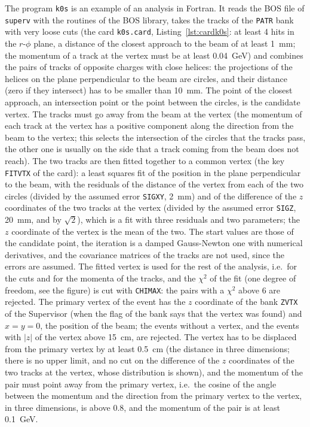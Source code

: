 The program \texttt{k0s} is an example of an analysis in Fortran. It reads the BOS file of \texttt{superv} with the routines of the BOS library, takes the tracks of the \texttt{PATR} bank with very loose cuts (the card \texttt{k0s.card}, Listing~\ref{lst:cardk0s}: at least 4 hits in the $r$-$\phi$ plane,
a distance of the closest approach to the beam of at least 1~mm; the momentum of a track at the vertex must be at least 0.04~GeV) and combines the pairs of tracks of opposite charges with close helices: the projections of the helices on the plane perpendicular to the beam are circles, and their distance
(zero if they intersect) has to be smaller than 10~mm. The point of the closest approach, an intersection point or the point between the circles, is the candidate vertex. The tracks must go away from the beam at the vertex (the momentum of each track at the vertex has a positive component along the direction from the beam to the vertex; this selects the intersection of the circles that the tracks pass, the other one is usually on the side that a track coming from the beam does not reach). The two tracks are then fitted together to a common vertex (the key \texttt{FITVTX} of the card): a least squares fit of the position in the plane perpendicular to the beam, with the residuals of the distance of the vertex from each of the two circles (divided by the assumed error \texttt{SIGXY}, 2~mm) and of the difference of the $z$ coordinates of the two tracks at the vertex (divided by the assumed error \texttt{SIGZ}, 20~mm, and by $\sqrt2$), which is a fit with three residuals and two parameters; the $z$ coordinate of the vertex is the mean of the two. The start values are those of the candidate point, the iteration is a damped Gauss-Newton one with numerical derivatives, and the covariance matrices of the tracks are not used, since the errors are assumed. The fitted vertex is used for the rest of the analysis, i.e.\ for the cuts and for the momenta of the tracks, and the $\chi^2$ of the fit (one degree of freedom, see the figure) is cut with \texttt{CHIMAX}: the pairs with a $\chi^2$ above 6 are rejected. The primary vertex of the event has the $z$ coordinate of the bank \texttt{ZVTX} of the Supervisor (when the flag of the bank says that the vertex was found) and $x=y=0$, the position of the beam; the events without a vertex, and the events with $|z|$ of the vertex above 15~cm, are rejected. The vertex has to be displaced from the primary vertex by at least 0.5~cm (the distance in three dimensions; there is no upper limit, and no cut on the difference of the $z$ coordinates of the two tracks at the vertex, whose distribution is shown), and the momentum of the pair must point away from the primary vertex, i.e.\ the cosine of the angle between the momentum and the direction from the primary vertex to the vertex, in three dimensions, is above 0.8, and the momentum of the pair is at least 0.1~GeV.

